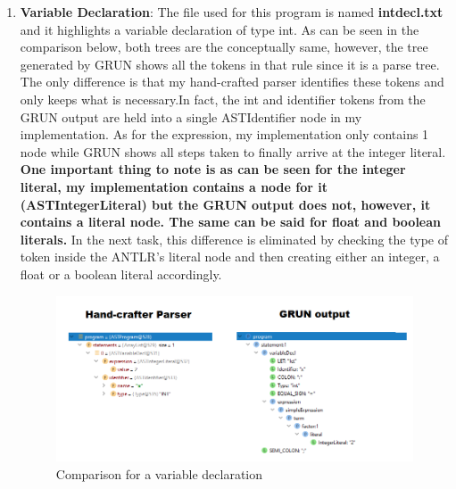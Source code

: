\documentclass{article}
\begin{document}
		\begin{enumerate}
		\item \textbf{Variable Declaration}: The file used for this program is named \textbf{intdecl.txt} and it highlights a variable declaration of type int. As can be seen in the comparison below, both trees are the conceptually same, however, the tree generated by GRUN shows all the tokens in that rule since it is a parse tree. The only difference is that my hand-crafted parser identifies these tokens and only keeps what is necessary.In fact, the int and identifier tokens from the GRUN output are held into a single ASTIdentifier node in my implementation. As for the expression, my implementation only contains 1 node while GRUN shows all steps taken to finally arrive at the integer literal. \textbf{One important thing to note is as can be seen for the integer literal, my implementation contains a node for it (ASTIntegerLiteral) but the GRUN output does not, however, it contains a literal node. The same can be said for float and boolean literals.} In the next task, this difference is eliminated by checking the type of token inside the ANTLR's literal node and then creating either an integer, a float or a boolean literal accordingly.
						\begin{figure}[H]
					\centering
			 			\includegraphics[width=\textwidth]{comparedecl.png}
			  			\caption{Comparison for a variable declaration}
			  			\label{fig:comparedecl}
					\end{figure}
					

\end{enumerate}
\end{document}
